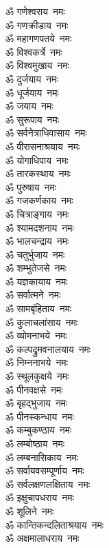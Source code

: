\begin{multicols}{2}
\begin{flushleft}
ॐ गणेश्वराय~नमः\\
ॐ गणक्रीडाय~नमः\\
ॐ महागणपतये~नमः\\
ॐ विश्वकर्त्रे~नमः\\
ॐ विश्वमुखाय~नमः\\
ॐ दुर्जयाय~नमः\\
ॐ धूर्जयाय~नमः\\
ॐ जयाय~नमः\\
ॐ सुरूपाय~नमः\\
ॐ सर्वनेत्राधिवासाय~नमः\hfill{}\\
ॐ वीरासनाश्रयाय~नमः\\
ॐ योगाधिपाय~नमः\\
ॐ तारकस्थाय~नमः\\
ॐ पुरुषाय~नमः\\
ॐ गजकर्णकाय~नमः\\
ॐ चित्राङ्गाय~नमः\\
ॐ श्यामदशनाय~नमः\\
ॐ भालचन्द्राय~नमः\\
ॐ चतुर्भुजाय~नमः\\
ॐ शम्भुतेजसे~नमः\hfill{}\\
ॐ यज्ञकायाय~नमः\\
ॐ सर्वात्मने~नमः\\
ॐ सामबृंहिताय~नमः\\
ॐ कुलाचलांसाय~नमः\\
ॐ व्योमनाभये~नमः\\
ॐ कल्पद्रुमवनालयाय~नमः\\
ॐ निम्ननाभये~नमः\\
ॐ स्थूलकुक्षये~नमः\\
ॐ पीनवक्षसे~नमः\\
ॐ बृहद्भुजाय~नमः\hfill{}\\
ॐ पीनस्कन्धाय~नमः\\
ॐ कम्बुकण्ठाय~नमः\\
ॐ लम्बोष्ठाय~नमः\\
ॐ लम्बनासिकाय~नमः\\
ॐ सर्वायवसम्पूर्णाय~नमः\\
ॐ सर्वलक्षणलक्षिताय~नमः\\
ॐ इक्षुचापधराय~नमः\\
ॐ शूलिने~नमः\\
ॐ कान्तिकन्दलिताश्रयाय~नमः\\
ॐ अक्षमालाधराय~नमः\hfill{}\\

\end{flushleft}
\end{multicols}
